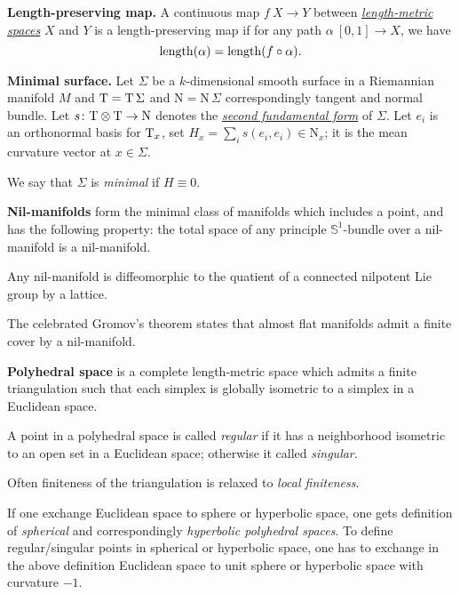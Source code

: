 \begin{description}
\item{\bf Length-preserving map.}\label{Length-preserving map} 
A continuous map $f\:X\to Y$ between 
\hyperref[Length-metric space]{\emph{length-metric spaces}} 
$X$ and $Y$ is a length-preserving map if for any path $\alpha\:[0,1]\to X$, we have 
$$\operatorname{\rm length}(\alpha)=\operatorname{\rm length}(f\circ\alpha).$$

\item{\bf Minimal surface.}\label{Minimal surface} 
Let $\Sigma$ be a $k$-dimensional smooth surface in
a Riemannian manifold $M$
and $\mathrm{T}=\mathrm{T}\,\Sigma$ and $\mathrm{N}=\mathrm{N}\,\Sigma$ correspondingly tangent and normal bundle.
Let $s\colon\mathrm{T}\otimes \mathrm{T}\to \mathrm{N}$ denotes the \hyperref[Second fundamental form]{\emph{second fundamental form}} of $\Sigma$.
Let  $e_i$ is an orthonormal basis for $\mathrm{T}_x$, 
set $H_x=\sum_i s(e_i,e_i)\in \mathrm{N}_x$; 
it is the mean curvature vector at $x\in \Sigma$. 

We say that $\Sigma$ is \emph{minimal} if $H\equiv 0$.

\item{\bf Nil-manifolds}\label{Nil-manifolds} form the minimal class of manifolds which includes a point, and has the following property:  
the total space of any principle $\mathbb{S}^1$-bundle over a nil-manifold is a nil-manifold. 

Any nil-manifold is diffeomorphic to the quatient of a connected nilpotent Lie group by a lattice.

The celebrated Gromov's theorem states that almost flat manifolds admit a finite cover by a nil-manifold.



\item{\bf Polyhedral space}\label{Polyhedral space}
is a complete length-metric space which admits a finite triangulation 
such that each simplex is globally isometric to a simplex in a Euclidean space.

A point in a polyhedral space is called \emph{regular} if it has a neighborhood isometric to an open set in a Euclidean space;
otherwise it called \emph{singular}.

Often finiteness of the triangulation is relaxed to \emph{local finiteness}.

If one exchange Euclidean space to sphere or hyperbolic space,
one gets definition of \emph{spherical} and correspondingly \emph{hyperbolic polyhedral spaces}.
To define regular/singular points in spherical or hyperbolic space,
one has to exchange in the above definition Euclidean space to unit sphere or hyperbolic space with curvature $-1$.



\end{description}
